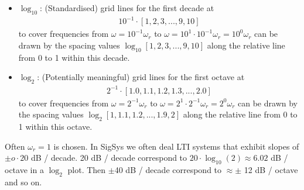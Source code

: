 \begin{center}
\end{center}



\begin{itemize}
  \item $\log_{10}$:
  (Standardised) grid lines for the first decade at
  \begin{align}
  10^{-1} \cdot [1,2,3,...,9,10]
  \end{align}
  to cover frequencies from $\omega=10^{-1} \omega_r$ to $\omega=10^1 \cdot 10^{-1} \omega_r= 10^0 \omega_r$
  can be drawn by the spacing values $\log_{10}[1,2,3,...,9,10]$
  along the relative line from 0 to 1 within this decade.
  \item $\log_{2}$:
  (Potentially meaningful) grid lines for the first octave at
  \begin{align}
  2^{-1} \cdot [1.0, 1.1, 1.2, 1.3,...,2.0]
  \end{align}
  to cover frequencies from $\omega=2^{-1} \omega_r$ to $\omega=2^1 \cdot 2^{-1} \omega_r = 2^0 \omega_r$
  can be drawn by the spacing values $\log_{2}[1,1.1,1.2,...,1.9,2]$
  along the relative line from 0 to 1 within this octave.
\end{itemize}
%
Often $\omega_r = 1$ is chosen.
In SigSys we often deal LTI systems that exhibit slopes of $\pm o \cdot 20$ dB / decade.
20 dB / decade correspond to $20\cdot \log_{10}(2) \approx 6.02$ dB / octave
in a $\log_2$ plot.
Then $\pm$40 dB / decade correspond to $\approx\pm$ 12 dB / octave and so on.





% 
% 
